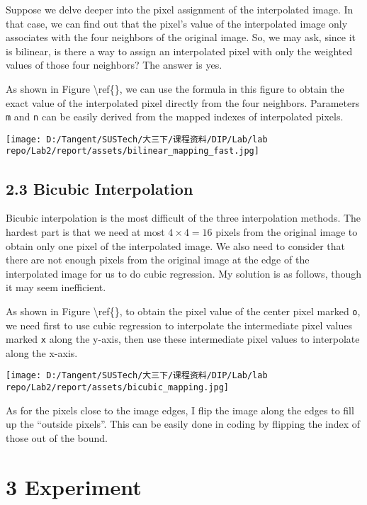 \documentclass[
]{article}
\begin{document}
Suppose we delve deeper into the pixel assignment of the interpolated
image. In that case, we can find out that the pixel's value of the
interpolated image only associates with the four neighbors of the
original image. So, we may ask, since it is bilinear, is there a way to
assign an interpolated pixel with only the weighted values of those four
neighbors? The answer is yes.

As shown in Figure \textbackslash ref\{\}, we can use the formula in
this figure to obtain the exact value of the interpolated pixel directly
from the four neighbors. Parameters \texttt{m} and \texttt{n} can be
easily derived from the mapped indexes of interpolated pixels.

\texttt{[image: D:/Tangent/SUSTech/大三下/课程资料/DIP/Lab/lab repo/Lab2/report/assets/bilinear\_mapping\_fast.jpg]}

\hypertarget{23-bicubic-interpolation}{%
\subsection{2.3 Bicubic Interpolation}\label{23-bicubic-interpolation}}

Bicubic interpolation is the most difficult of the three interpolation
methods. The hardest part is that we need at most \(4\times4=16\) pixels
from the original image to obtain only one pixel of the interpolated
image. We also need to consider that there are not enough pixels from
the original image at the edge of the interpolated image for us to do
cubic regression. My solution is as follows, though it may seem
inefficient.

As shown in Figure \textbackslash ref\{\}, to obtain the pixel value of
the center pixel marked \texttt{o}, we need first to use cubic
regression to interpolate the intermediate pixel values marked
\texttt{x} along the y-axis, then use these intermediate pixel values to
interpolate along the x-axis.

\texttt{[image: D:/Tangent/SUSTech/大三下/课程资料/DIP/Lab/lab repo/Lab2/report/assets/bicubic\_mapping.jpg]}

As for the pixels close to the image edges, I flip the image along the
edges to fill up the ``outside pixels''. This can be easily done in
coding by flipping the index of those out of the bound.

\hypertarget{3-experiment}{%
\section{3 Experiment}\label{3-experiment}}
\end{document}

